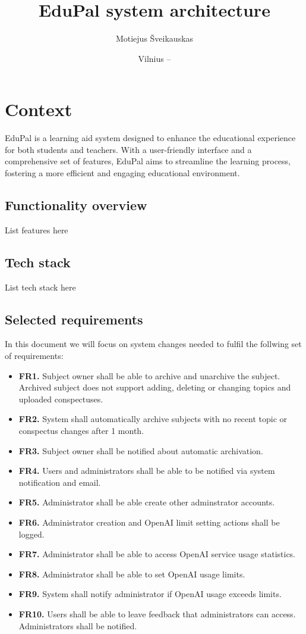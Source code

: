 \documentclass[
    english, %
]{VUMIFPSkursinis}
\title{EduPal system architecture}
\author{Motiejus Šveikauskas}
\date{Vilnius – \the\year}
\begin{document}
\maketitle

\tableofcontents

\section{Context}
EduPal is a learning aid system designed to enhance
the educational experience for both students and teachers. With a user-friendly interface and a comprehensive set of features, EduPal aims to streamline the learning process, fostering a more efficient and engaging educational environment.

\subsection{Functionality overview}
List features here

\subsection{Tech stack}
List tech stack here

\subsection{Selected requirements}
In this document we will focus on system changes needed to fulfil the follwing set of requirements:

\begin{itemize}
    \item \textbf{FR1.} Subject owner shall be able to archive and unarchive the subject. Archived subject does not support adding, deleting or changing topics and uploaded conspectuses.
    \item \textbf{FR2.} System shall automatically archive subjects with no recent topic or conspectus changes after 1 month.
    \item \textbf{FR3.} Subject owner shall be notified about automatic archivation.
    \item \textbf{FR4.} Users and administrators shall be able to be notified via system notification and email.
    \item \textbf{FR5.} Administrator shall be able create other adminstrator accounts.
    \item \textbf{FR6.} Administrator creation and OpenAI limit setting actions shall be logged.
    \item \textbf{FR7.} Administrator shall be able to access OpenAI service usage statistics.
    \item \textbf{FR8.} Administrator shall be able to set OpenAI usage limits.
    \item \textbf{FR9.} System shall notify administrator if OpenAI usage exceeds limits.
    \item \textbf{FR10.} Users shall be able to leave feedback that administrators can access. Administrators shall be notified.
\end{itemize}
\end{document}

